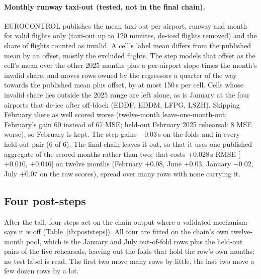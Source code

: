 \documentclass[
  manuscript=article,
  layout=preprint,
  year=2026,
  volume=x,
]{extra/joas}
\begin{document}
\paragraph{Monthly runway taxi-out (tested, not in the final chain).} EUROCONTROL publishes the mean taxi-out per airport, runway and month for valid flights only
(taxi-out up to 120 minutes, de-iced flights removed) and the share of flights counted as invalid. A cell's label mean differs from the
published mean by an offset, mostly the excluded flights. The step models that offset as the cell's mean over the other 2025 months plus
a per-airport slope times the month's invalid share, and moves rows owned by the regressors a quarter of the way towards the published mean
plus offset, by at most 150\,s per cell. Cells whose invalid share lies outside the 2025 range are left alone, as is January at the four
airports that de-ice after off-block (EDDF, EDDM, LFPG, LSZH). Skipping February there as well scored worse (twelve-month
leave-one-month-out: February's gain 60 instead of 67 MSE; held-out February 2025 rehearsal: 8 MSE worse), so February is kept. The
step gains $-0.03$\,s on the folds and in every held-out pair (6 of 6). The final chain leaves it out, so that it uses one published
aggregate of the scored months rather than two; that costs $+0.028$\,s RMSE [$+0.010$, $+0.046$] on twelve months (February $+0.08$, June
$+0.03$, January $-0.02$, July $+0.07$ on the raw scores), spread over many rows with none carrying it.

\subsection{Four post-steps}
\label{sec:poststeps}

After the tail, four steps act on the chain output where a validated mechanism says it is off (Table~\ref{tb:poststeps}). All four are fitted on the chain's
own twelve-month pool, which is the January and July out-of-fold rows plus the held-out pairs of the five rehearsals, leaving out the folds that hold the
row's own months; no test label is read. The first two move many rows by little, the last two move a few dozen rows by a lot.
\end{document}
